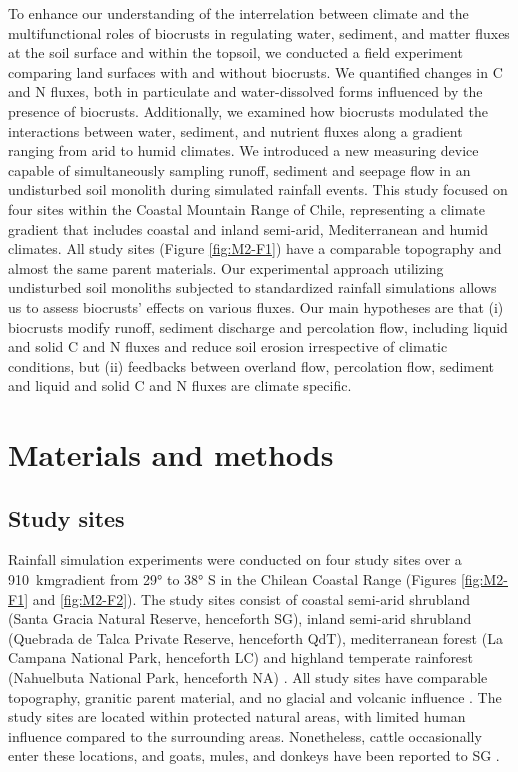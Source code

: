 To enhance our understanding of the interrelation between climate and the multifunctional roles of biocrusts in regulating water, sediment, and matter fluxes at the soil surface and within the topsoil, we conducted a field experiment comparing land surfaces with and without biocrusts. We quantified changes in C and N fluxes, both in particulate and water-dissolved forms influenced by the presence of biocrusts. Additionally, we examined how biocrusts modulated the interactions between water, sediment, and nutrient fluxes along a gradient ranging from arid to humid climates. We introduced a new measuring device capable of simultaneously sampling runoff, sediment and seepage flow in an undisturbed soil monolith during simulated rainfall events. This study focused on four sites within the Coastal Mountain Range of Chile, representing a climate gradient that includes coastal and inland semi-arid, Mediterranean and humid climates. All study sites (Figure \ref{fig:M2-F1}) have a comparable topography and almost the same parent materials. Our experimental approach utilizing undisturbed soil monoliths subjected to standardized rainfall simulations allows us to assess biocrusts' effects on various fluxes. Our main hypotheses are that (i) biocrusts modify runoff, sediment discharge and percolation flow, including liquid and solid C and N fluxes and reduce soil erosion irrespective of climatic conditions, but (ii) feedbacks between overland flow, percolation flow, sediment and liquid and solid C and N fluxes are climate specific.

\section{Materials and methods}
\subsection{Study sites}

Rainfall simulation experiments were conducted on four study sites over a \SI{910}{\kilo\meter}gradient from \ang{29} to \ang{38} S in the Chilean Coastal Range (Figures \ref{fig:M2-F1} and \ref{fig:M2-F2}). The study sites consist of coastal semi-arid shrubland (Santa Gracia Natural Reserve, henceforth SG), inland semi-arid shrubland (Quebrada de Talca Private Reserve, henceforth QdT), mediterranean forest (La Campana National Park, henceforth LC) and highland temperate rainforest (Nahuelbuta National Park, henceforth NA) \citep{Canessa2022}. All study sites have comparable topography, granitic parent material, and no glacial and volcanic influence \citep{Bernhard2018}. The study sites are located within protected natural areas, with limited human influence compared to the surrounding areas. Nonetheless, cattle occasionally enter these locations, and goats, mules, and donkeys have been reported to SG \citep{Armesto2007}.

